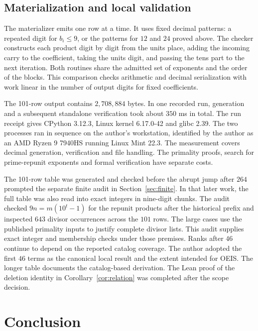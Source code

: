 \documentclass[11pt]{article}
\begin{document}
\subsection{Materialization and local validation}

The materializer emits one row at a time. It uses fixed decimal
patterns: a repeated digit for \(b_i\le9\), or the patterns for \(12\)
and \(24\) proved above. The checker constructs each product
digit by digit from the units place, adding the incoming carry to the
coefficient, taking the units digit, and passing the tens part to
the next iteration. Both routines share the admitted set of exponents
and the order of the blocks. This comparison checks arithmetic and
decimal serialization with work linear in the number of output
digits for fixed coefficients.

The 101-row output contains \(2{,}708{,}884\) bytes. In one recorded run,
generation and a subsequent standalone verification took about \(350\) ms
in total. The run receipt gives CPython 3.12.3, Linux kernel
6.17.0-42 and glibc 2.39. The two processes ran in sequence on the
author's workstation, identified by the author as an AMD Ryzen 9
7940HS running Linux Mint 22.3. The measurement covers decimal generation,
verification and file handling. The primality proofs, search for
prime-repunit exponents and formal verification have separate costs.

The 101-row table was generated and checked before the abrupt jump
after \(264\) prompted the separate finite audit in
Section~\ref{sec:finite}. In that later work, the full table was also
read into exact integers in nine-digit chunks. The audit checked
\(9n=m(10^t-1)\) for the repunit products after the historical prefix
and inspected \(643\) divisor occurrences across the \(101\) rows.
The large cases use the published primality inputs to justify complete
divisor lists. This audit supplies exact integer and membership
checks under those premises. Ranks after \(46\) continue to depend
on the reported catalog coverage. The author adopted the first \(46\)
terms as the canonical local result and the extent intended for OEIS.
The longer table documents the catalog-based derivation. The Lean
proof of the deletion identity in Corollary~\ref{cor:relation} was
completed after the scope decision.

\section{Conclusion}
\end{document}
